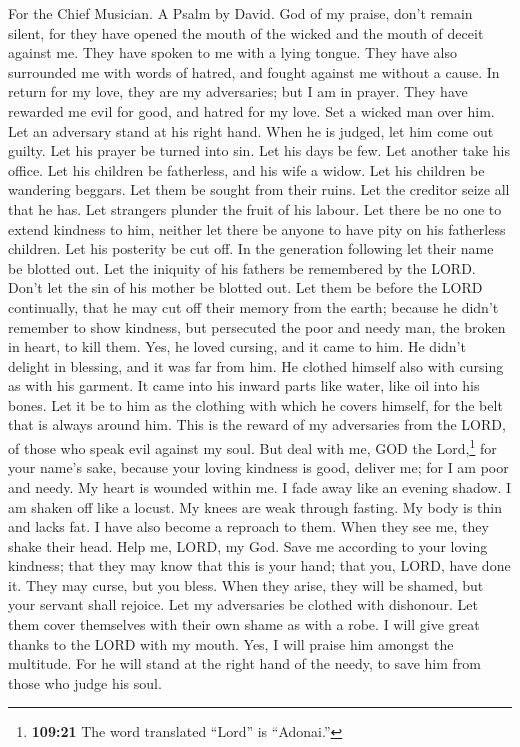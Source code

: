 For the Chief Musician. A Psalm by David.  God of my
praise, don't remain silent,  for they have opened the
mouth of the wicked and the mouth of deceit against me. They have spoken
to me with a lying tongue.  They have also surrounded me
with words of hatred, and fought against me without a cause.
 In return for my love, they are my adversaries; but I am
in prayer.  They have rewarded me evil for good, and
hatred for my love.  Set a wicked man over him. Let an
adversary stand at his right hand.  When he is judged, let
him come out guilty. Let his prayer be turned into sin. 
Let his days be few. Let another take his office.  Let his
children be fatherless, and his wife a widow.  Let his
children be wandering beggars. Let them be sought from their ruins.
 Let the creditor seize all that he has. Let strangers
plunder the fruit of his labour.  Let there be no one to
extend kindness to him, neither let there be anyone to have pity on his
fatherless children.  Let his posterity be cut off. In
the generation following let their name be blotted out. 
Let the iniquity of his fathers be remembered by the LORD. Don't let the
sin of his mother be blotted out.  Let them be before the
LORD continually, that he may cut off their memory from the earth;
 because he didn't remember to show kindness, but
persecuted the poor and needy man, the broken in heart, to kill them.
 Yes, he loved cursing, and it came to him. He didn't
delight in blessing, and it was far from him.  He clothed
himself also with cursing as with his garment. It came into his inward
parts like water, like oil into his bones.  Let it be to
him as the clothing with which he covers himself, for the belt that is
always around him.  This is the reward of my adversaries
from the LORD, of those who speak evil against my soul. 
But deal with me, GOD the Lord,\footnote{\textbf{109:21} The word
  translated ``Lord'' is ``Adonai.''} for your name's sake, because your
loving kindness is good, deliver me;  for I am poor and
needy. My heart is wounded within me.  I fade away like
an evening shadow. I am shaken off like a locust.  My
knees are weak through fasting. My body is thin and lacks fat.
 I have also become a reproach to them. When they see me,
they shake their head.  Help me, LORD, my God. Save me
according to your loving kindness;  that they may know
that this is your hand; that you, LORD, have done it. 
They may curse, but you bless. When they arise, they will be shamed, but
your servant shall rejoice.  Let my adversaries be
clothed with dishonour. Let them cover themselves with their own shame
as with a robe.  I will give great thanks to the LORD
with my mouth. Yes, I will praise him amongst the multitude.
 For he will stand at the right hand of the needy, to
save him from those who judge his soul.

